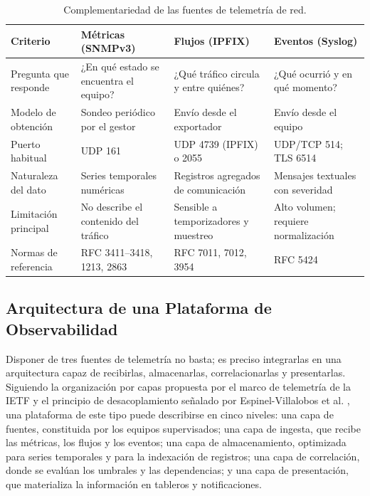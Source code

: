\begin{table}[htbp]
  \centering
  \footnotesize
  \caption{Complementariedad de las fuentes de telemetría de red.}
  \label{tab:pilares}
  \renewcommand{\arraystretch}{1.2}
  \begin{tabular}{|p{2.2cm}|p{3.3cm}|p{3.3cm}|p{3.3cm}|}
    \hline
    \textbf{Criterio} & \textbf{Métricas (SNMPv3)} & \textbf{Flujos (IPFIX)} & \textbf{Eventos (Syslog)} \\
    \hline
    Pregunta que responde & ¿En qué estado se encuentra el equipo? & ¿Qué tráfico circula y entre quiénes? & ¿Qué ocurrió y en qué momento? \\
    \hline
    Modelo de obtención & Sondeo periódico por el gestor & Envío desde el exportador & Envío desde el equipo \\
    \hline
    Puerto habitual & UDP 161 & UDP 4739 (IPFIX) o 2055 & UDP/TCP 514; TLS 6514 \\
    \hline
    Naturaleza del dato & Series temporales numéricas & Registros agregados de comunicación & Mensajes textuales con severidad \\
    \hline
    Limitación principal & No describe el contenido del tráfico & Sensible a temporizadores y muestreo & Alto volumen; requiere normalización \\
    \hline
    Normas de referencia & RFC 3411--3418, 1213, 2863 & RFC 7011, 7012, 3954 & RFC 5424 \\
    \hline
  \end{tabular}
  \par\vspace{1.5mm}
\end{table}

\subsection{Arquitectura de una Plataforma de Observabilidad}

Disponer de tres fuentes de telemetría no basta; es preciso integrarlas en una arquitectura capaz de recibirlas, almacenarlas, correlacionarlas y presentarlas. Siguiendo la organización por capas propuesta por el marco de telemetría de la IETF \cite{song2022network} y el principio de desacoplamiento señalado por Espinel-Villalobos et al. \cite{espinel2022design}, una plataforma de este tipo puede describirse en cinco niveles: una capa de fuentes, constituida por los equipos supervisados; una capa de ingesta, que recibe las métricas, los flujos y los eventos; una capa de almacenamiento, optimizada para series temporales y para la indexación de registros; una capa de correlación, donde se evalúan los umbrales y las dependencias; y una capa de presentación, que materializa la información en tableros y notificaciones.

